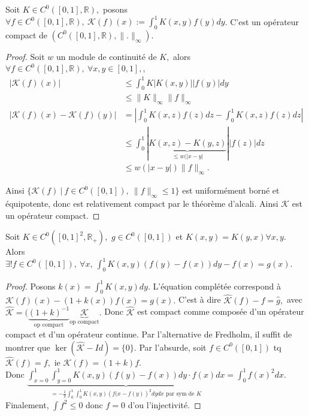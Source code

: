 \begin{lemme}
    Soit $K\in C^0([0,1],\mathbb{R} ),$ posons $\forall f\in C^0([0,1],\mathbb{R} ),\ \mathcal{K}(f)(x):=\int_0^1K(x,y)f(y)dy$. C'est un opérateur compact de  $(C^0([0,1],\mathbb{R} ),\|.\|_\infty )$.
\end{lemme}
\begin{proof}
    Soit $w$ un module de continuité de $K,$ alors $\forall f\in C^0([0,1],\mathbb{R} ),\ \forall x,y\in [0,1], $,
    \begin{align*}
        |\mathcal{K}(f)(x)| &\le \int_{0}^{1} K|K(x,y)| |f(y)| dy \\
        &\le \|K\|_\infty \|f\|_\infty \\
        |\mathcal{K}(f)(x)-\mathcal{K}(f)(y)| &= |\int_{0}^{1} K(x,z)f(z)dz-\int_{0}^{1} K(x,z)f(z)dz  | \\
                                              &\le \int_{0}^{1} |\underbrace{K(x,z)-K(y,z)}_{\le w(|x-y| }||f(z)| dz\\
                                              &\le w(|x-y| )\|f\|_\infty
    .\end{align*}

    Ainsi $\{\mathcal{K}(f)\ |\ f\in C^0([0,1]),\ \|f\|_\infty \le 1\} $ est uniformément borné et équipotente, donc est relativement compact par le théorème d'alcali. Ainsi $\mathcal{K}$ est un opérateur compact.
\end{proof}
\begin{corollaire}
    Soit $K\in C^0([0,1]^2,\mathbb{R}_+ ),$ $g\in C^0([0,1])$ et $K(x,y)=K(y,x)\forall x,y.  $  Alors $\exists !f\in C^0([0,1]),\ \forall x,\ \int_{0}^{1} K(x,y)\left( f(y)-f(x) \right) dy-f(x)=g(x).  $
\end{corollaire}
\begin{proof}
    Posons $k(x)=\int_{0}^{1} K(x,y)dy .$ L'équation complétée correspond à $\mathcal{K}(f)(x)-(1+k(x))f(x)=g(x).$ C'est à dire $\hat{\mathcal{K}}(f)-f=\hat{g},$ avec $\hat{\mathcal{K}}=(\underbrace{\left( 1+k \right) ^{-1} }_{\text{op compact}}\underbrace{\mathcal{K}}_{\text{op compact}}.$ Donc $\hat{\mathcal{K}}$ est compact comme composée d'un opérateur compact et d'un opérateur continue. Par l'alternative de Fredholm, il suffit de montrer que $\ker(\hat{\mathcal{K}}-Id)=\{0\} .$ Par l'absurde, soit $f\in C^0([0,1])$ tq $\hat{\mathcal{K}}(f)=f,$ ie $\mathcal{K}(f)=(1+k)f.$ \\
    Donc $\underbrace{\int_{x=0}^{1} \int_{y=0}^{1} K(x,y)\left( f(y)-f(x) \right) dy \cdot f(x)dx}_{=-\frac{1}{2}\int_{0}^{1} \int_{0}^{1} K(x,y)\left( f(x-f(y) \right) ^2dydx \text{ par sym de }K } =\int_0^1 f(x)^2dx $.\\
    Finalement, $\int f^2\le 0$ donc $f=0$ d'ou l'injectivité.
\end{proof}
